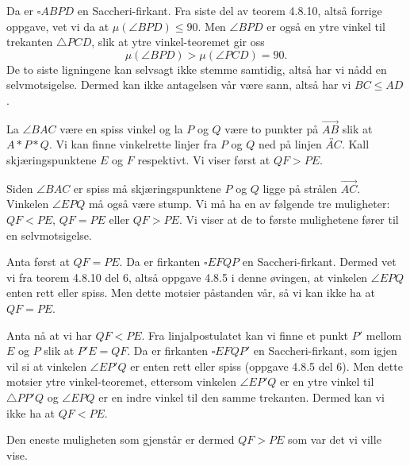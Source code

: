 \begin{oppgave}[4.8.8]
\begin{enumerate}
        Da er $\square ABPD$ en Saccheri-firkant. 
        Fra siste del av teorem 4.8.10, altså forrige oppgave, vet vi da at $\mu(\angle BPD)\leq 90$. 
        Men $\angle BPD$ er også en ytre vinkel til trekanten $\triangle PCD$, slik at ytre vinkel-teoremet gir oss
        $$\mu(\angle BPD)>\mu(\angle PCD) =90.$$
        De to siste ligningene kan selvsagt ikke stemme samtidig, altså har vi nådd en selvmotsigelse. 
        Dermed kan ikke antagelsen vår være sann, altså har vi $BC\leq AD$. 
    \end{enumerate}
\end{oppgave}

\begin{oppgave}[4.8.10]
    La $\angle BAC$ være en spiss vinkel og la $P$ og $Q$ være to punkter på $\overrightarrow{AB}$ slik at $A\ast P\ast Q$. 
    Vi kan finne vinkelrette linjer fra $P$ og $Q$ ned på linjen $\overleftrightarrow{AC}$. 
    Kall skjæringspunktene $E$ og $F$ respektivt. Vi viser først at $QF>PE$. 

    Siden $\angle BAC$ er spiss må skjæringspunktene $P$ og $Q$ ligge på strålen $\overrightarrow{AC}$. 
    Vinkelen $\angle EPQ$ må også være stump. 
    Vi må ha en av følgende tre muligheter: $QF<PE$, $QF=PE$ eller $QF>PE$.
    Vi viser at de to første mulighetene fører til en selvmotsigelse. 
    
    Anta først at $QF=PE$. 
    Da er firkanten $\square EFQP$ en Saccheri-firkant. 
    Dermed vet vi fra teorem 4.8.10 del 6, altså oppgave 4.8.5 i denne øvingen, at vinkelen $\angle EPQ$ enten rett eller spiss. 
    Men dette motsier påstanden vår, så vi kan ikke ha at $QF=PE$.

    Anta nå at vi har $QF<PE$. Fra linjalpostulatet kan vi finne et punkt $P'$ mellom $E$ og $P$ slik at $P'E=QF$.
    Da er firkanten $\square EFQP'$ en Saccheri-firkant, som igjen vil si at vinkelen $\angle EP'Q$ er enten rett eller spiss (oppgave 4.8.5 del 6). 
    Men dette motsier ytre vinkel-teoremet, ettersom vinkelen $\angle EP'Q$ er en ytre vinkel til $\triangle PP'Q$ og $\angle EPQ$ er en indre vinkel til den samme trekanten. 
    Dermed kan vi ikke ha at $QF<PE$. 

    Den eneste muligheten som gjenstår er dermed $QF>PE$ som var det vi ville vise. 

    \begin{figure}[H]
        \centering
         
    \end{figure}


\end{oppgave}
